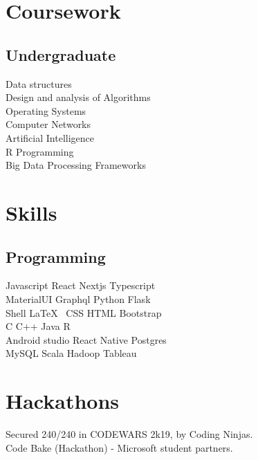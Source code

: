 \documentclass[]{manoj-resume}
\begin{document}
\begin{minipage}[t]{0.33\textwidth}

\section{Coursework}

\subsection{Undergraduate}
Data structures \\
Design and analysis of Algorithms \\
Operating Systems \\
Computer Networks \\
Artificial Intelligence \\
R Programming \\
Big Data Processing Frameworks \\


\section{Skills}
\subsection{Programming}
Javascript \textbullet{}   React \textbullet{} Nextjs \textbullet{} Typescript \\ 
MaterialUI \textbullet{} Graphql \textbullet{} Python \textbullet{}  Flask \\ 
Shell  \textbullet{} \LaTeX\ \textbullet{} CSS \textbullet{} HTML \textbullet{} Bootstrap\\ 
C \textbullet{} C++ \textbullet{} Java \textbullet{} R \\
Android studio \textbullet{} React Native \textbullet{} Postgres \\
 MySQL \textbullet{} Scala \textbullet{} Hadoop \textbullet{} Tableau
\sectionsep


\section{Hackathons}
\textbullet{} Secured 240/240 in CODEWARS 2k19, by Coding Ninjas. \\
\textbullet{} Code Bake (Hackathon) - Microsoft student partners.

%
%

\end{minipage} 
\end{document}
